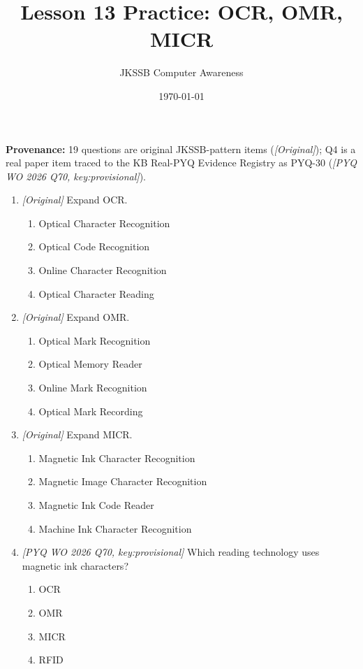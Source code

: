 \documentclass[11pt]{article}
\title{Lesson 13 Practice: OCR, OMR, MICR}
\author{JKSSB Computer Awareness}
\date{\today}
\begin{document}
\maketitle
\noindent\textbf{Provenance:} 19 questions are original JKSSB-pattern items
(\textit{[Original]}); Q4 is a real paper item traced to the KB Real-PYQ
Evidence Registry as PYQ-30 (\textit{[PYQ WO 2026 Q70, key:provisional]}).

\begin{enumerate}[label=\textbf{Q\arabic*.}, leftmargin=*]
\item \textit{[Original]} Expand OCR.
  \begin{enumerate}[label=\Alph*.]
    \item Optical Character Recognition
    \item Optical Code Recognition
    \item Online Character Recognition
    \item Optical Character Reading
  \end{enumerate}
\item \textit{[Original]} Expand OMR.
  \begin{enumerate}[label=\Alph*.]
    \item Optical Mark Recognition
    \item Optical Memory Reader
    \item Online Mark Recognition
    \item Optical Mark Recording
  \end{enumerate}
\item \textit{[Original]} Expand MICR.
  \begin{enumerate}[label=\Alph*.]
    \item Magnetic Ink Character Recognition
    \item Magnetic Image Character Recognition
    \item Magnetic Ink Code Reader
    \item Machine Ink Character Recognition
  \end{enumerate}
\item \textit{[PYQ WO 2026 Q70, key:provisional]} Which reading technology
  uses magnetic ink characters?
  \begin{enumerate}[label=\Alph*.]
    \item OCR
    \item OMR
    \item MICR
    \item RFID
  \end{enumerate}

\end{enumerate}
\end{document}
